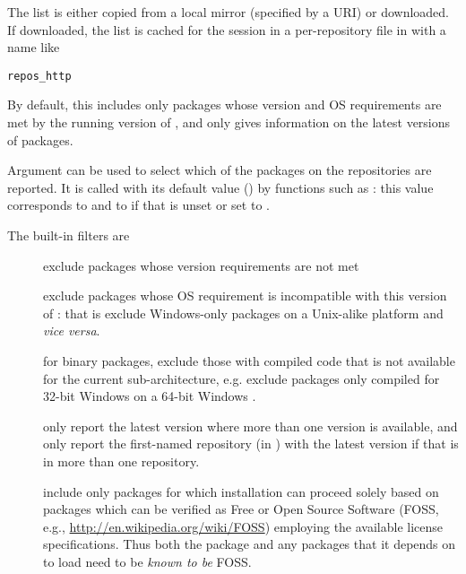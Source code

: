 \begin{Details}\relax
The list is either copied from a local mirror (specified by a
 URI) or downloaded.  If downloaded, the list is cached
for the \R{} session in a per-repository file in 
with a name like
\begin{alltt}
    repos_http%3a%2f%2fcran.r-project.org%2fsrc%2fcontrib.rds
 \end{alltt}


By default, this includes only packages whose version and OS
requirements are met by the running version of \R{}, and only gives
information on the latest versions of packages.

Argument  can be used to select which of the packages on the
repositories are reported.  It is called with its default value
() by functions such as : this value
corresponds to 
and to  if
that is unset or set to .

The built-in filters are
\begin{description}

\item[] exclude packages whose \R{} version
requirements are not met
\item[] exclude packages whose OS requirement is
incompatible with this version of \R{}: that is exclude
Windows-only packages on a Unix-alike platform
and \emph{vice versa}.
\item[] for binary packages, exclude those with
compiled code that is not available for the current
sub-architecture, e.g. exclude packages only compiled for 32-bit
Windows on a 64-bit Windows \R{}.
\item[] only report the latest version where more
than one version is available, and only report the first-named
repository (in ) with the latest version if that
is in more than one repository.
\item[] include only packages for which
installation can proceed solely based on packages which can be
verified as Free or Open Source Software (FOSS, e.g.,
\url{http://en.wikipedia.org/wiki/FOSS}) employing the available
license specifications.  Thus both the package and any packages
that it depends on to load need to be \emph{known to be} FOSS.


\end{description}
\end{Details}
